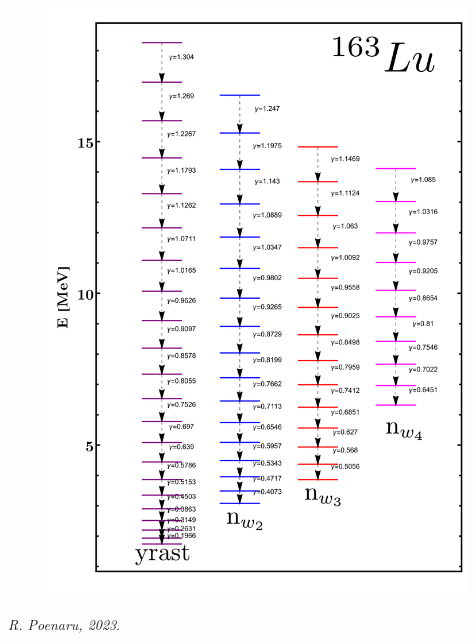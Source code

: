 \documentclass{beamer}
\begin{document}
\begin{frame}
\begin{columns}
\begin{column}{0.4\textwidth}
			\begin{figure}
				\centering
				\includegraphics[width=0.99\textwidth]{figures/lu-163-exp-data-eps-converted-to.pdf}
			\end{figure}
			\vspace{-0.4cm}
			\textit{R. Poenaru, 2023}.
		\end{column}
	\end{columns}
\end{frame}
\end{document}
